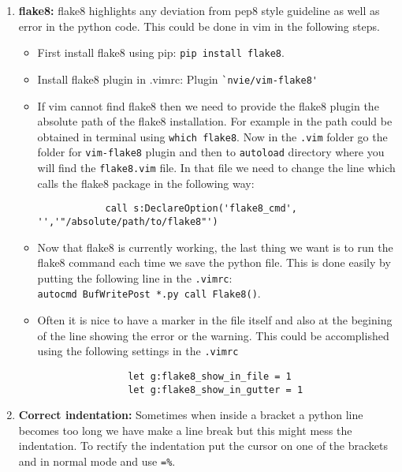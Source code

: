 \documentclass{article}
\begin{document}
\begin{enumerate}
    \item {\bfseries flake8:} flake8 highlights any deviation from pep8 style
        guideline as well as error in the python code. This could be done in vim
        in the following steps.
    \begin{itemize}
        \item First install flake8 using pip: \verb!pip install flake8!.
        \item Install flake8 plugin in .vimrc: Plugin \verb!`nvie/vim-flake8'!
        \item If vim cannot find flake8 then we need to provide the flake8
            plugin the absolute path of the flake8 installation. For example in
            the path could be obtained in terminal using \verb!which flake8!.
            Now in the \verb!.vim! folder go the folder for \verb!vim-flake8! 
            plugin and then to \verb!autoload! directory where you will find the 
            \verb!flake8.vim! file. In that file we need to change the line
            which calls the flake8 package in the following way:
            \begin{verbatim}
            call s:DeclareOption('flake8_cmd', '','"/absolute/path/to/flake8"')
            \end{verbatim}  
        \item Now that flake8 is currently working, the last thing we want is to 
            run the flake8 command each time we save the python file. This is done
            easily by putting the following line in the \verb!.vimrc!:\\
            \verb!autocmd BufWritePost *.py call Flake8()!.
        \item Often it is nice to have a marker in the file itself and also at
            the begining of the line showing the error or the warning. This
            could be accomplished using the following settings in the \verb!.vimrc!
            \begin{verbatim}
                let g:flake8_show_in_file = 1
                let g:flake8_show_in_gutter = 1
            \end{verbatim}
    \end{itemize}
\item {\bfseries Correct indentation:} Sometimes when inside a bracket a python
    line becomes too long we have make a line break but this might mess the 
    indentation. To rectify the indentation put the cursor on one of the
    brackets and in normal mode and use \verb!=%!.


\end{enumerate}
\end{document}
